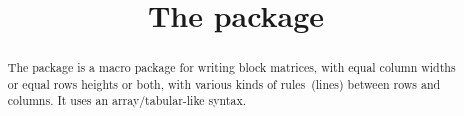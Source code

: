 \documentclass[twoside,a4paper]{article}
\title{The package \package{easybmat}}
\begin{document}
\maketitle
\begin{abstract}
  The  package is a macro package for writing block
  matrices, with equal column widths or equal rows heights or both,
  with various kinds of rules~(lines) between rows and columns.  It
  uses an array/ta\-bular-like syntax.
\end{abstract}


\tableofcontents
\clearpage

\pagestyle{fpage}
\def\sectionmark#1{\markboth{The package \package{easybmat}}{The package \package{easybmat}}}
\let\chaptermark\sectionmark
\let\subsectionmark\sectionmark
\end{document}
